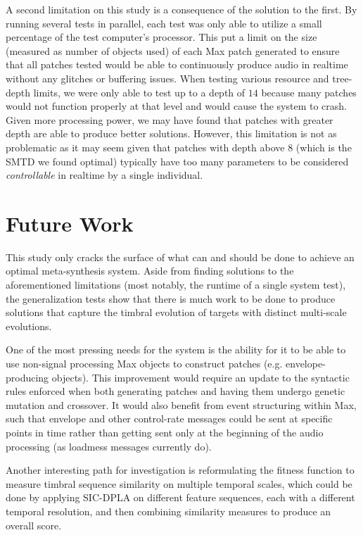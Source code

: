 \documentclass[a4paper,12pt]{report} 	%
\numberwithin{figure}{chapter}
\numberwithin{table}{chapter}
\numberwithin{equation}{chapter}
\begin{document}
\begin{flushleft}
A second limitation on this study is a consequence of the solution to the first. By running several tests in parallel, each test was only able to utilize a small percentage of the test computer's processor. This put a limit on the size (measured as number of objects used) of each Max patch generated to ensure that all patches tested would be able to continuously produce audio in realtime without any glitches or buffering issues. When testing various resource and tree-depth limits, we were only able to test up to a depth of $14$ because many patches would not function properly at that level and would cause the system to crash. Given more processing power, we may have found that patches with greater depth are able to produce better solutions. However, this limitation is not as problematic as it may seem given that patches with depth above $8$ (which is the SMTD we found optimal) typically have too many parameters to be considered \emph{controllable} in realtime by a single individual.

\section{Future Work}
This study only cracks the surface of what can and should be done to achieve an optimal meta-synthesis system. Aside from finding solutions to the aforementioned limitations (most notably, the runtime of a single system test), the generalization tests show that there is much work to be done to produce solutions that capture the timbral evolution of targets with distinct multi-scale evolutions.

One of the most pressing needs for the system is the ability for it to be able to use non-signal processing Max objects to construct patches (e.g. envelope-producing objects). This improvement would require an update to the syntactic rules enforced when both generating patches and having them undergo genetic mutation and crossover. It would also benefit from event structuring within Max, such that envelope and other control-rate messages could be sent at specific points in time rather than getting sent only at the beginning of the audio processing (as loadmess messages currently do).

Another interesting path for investigation is reformulating the fitness function to measure timbral sequence similarity on multiple temporal scales, which could be done by applying SIC-DPLA on different feature sequences, each with a different temporal resolution, and then combining similarity measures to produce an overall score.


\end{flushleft}
\end{document}
